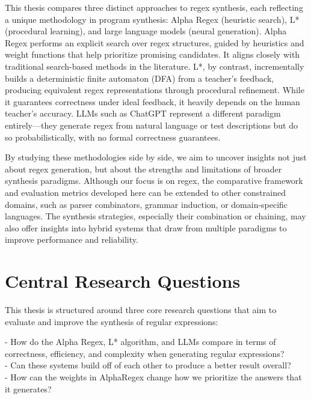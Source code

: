 \indent \indent This thesis compares three distinct approaches to regex synthesis, each reflecting a unique methodology in program synthesis: Alpha Regex (heuristic search), L* (procedural learning), and large language models (neural generation). Alpha Regex performs an explicit search over regex structures, guided by heuristics and weight functions that help prioritize promising candidates. It aligns closely with traditional search-based methods in the literature. L*, by contrast, incrementally builds a deterministic finite automaton (DFA) from a teacher's feedback, producing equivalent regex representations through procedural refinement. While it guarantees correctness under ideal feedback, it heavily depends on the human teacher's accuracy. LLMs such as ChatGPT represent a different paradigm entirely—they generate regex from natural language or test descriptions but do so probabilistically, with no formal correctness guarantees.

\indent \indent By studying these methodologies side by side, we aim to uncover insights not just about regex generation, but about the strengths and limitations of broader synthesis paradigms. Although our focus is on regex, the comparative framework and evaluation metrics developed here can be extended to other constrained domains, such as parser combinators, grammar induction, or domain-specific languages. The synthesis strategies, especially their combination or chaining, may also offer insights into hybrid systems that draw from multiple paradigms to improve performance and reliability.

\vspace{-0.4em}
\section{Central Research Questions}
\vspace{-0.4em}

\indent \indent This thesis is structured around three core research questions that aim to evaluate and improve the synthesis of regular expressions: 

- How do the Alpha Regex, L* algorithm, and LLMs compare in terms of correctness, efficiency, and complexity when generating regular expressions? \\
- Can these systems build off of each other to produce a better result overall? \\ 
- How can the weights in AlphaRegex change how we prioritize the answers that it generates? \\

